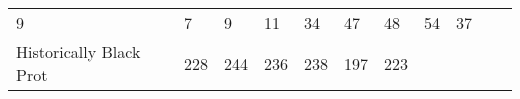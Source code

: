 \documentclass[]{article}
\begin{document}
\begin{longtable}[]{@{}lllllllllll@{}}
\begin{minipage}[t]{0.05\columnwidth}
9\strut
\end{minipage} & \begin{minipage}[t]{0.05\columnwidth}\raggedright\strut
7\strut
\end{minipage} & \begin{minipage}[t]{0.05\columnwidth}\raggedright\strut
9\strut
\end{minipage} & \begin{minipage}[t]{0.05\columnwidth}\raggedright\strut
11\strut
\end{minipage} & \begin{minipage}[t]{0.05\columnwidth}\raggedright\strut
34\strut
\end{minipage} & \begin{minipage}[t]{0.06\columnwidth}\raggedright\strut
47\strut
\end{minipage} & \begin{minipage}[t]{0.06\columnwidth}\raggedright\strut
48\strut
\end{minipage} & \begin{minipage}[t]{0.04\columnwidth}\raggedright\strut
54\strut
\end{minipage} & \begin{minipage}[t]{0.11\columnwidth}\raggedright\strut
37\strut
\end{minipage}\tabularnewline
\begin{minipage}[t]{0.14\columnwidth}\raggedright\strut
Historically Black Prot\strut
\end{minipage} & \begin{minipage}[t]{0.04\columnwidth}\raggedright\strut
228\strut
\end{minipage} & \begin{minipage}[t]{0.05\columnwidth}\raggedright\strut
244\strut
\end{minipage} & \begin{minipage}[t]{0.05\columnwidth}\raggedright\strut
236\strut
\end{minipage} & \begin{minipage}[t]{0.05\columnwidth}\raggedright\strut
238\strut
\end{minipage} & \begin{minipage}[t]{0.05\columnwidth}\raggedright\strut
197\strut
\end{minipage} & \begin{minipage}[t]{0.05\columnwidth}\raggedright\strut
223\strut
\end{minipage} & \begin{minipage}[t]{0.06\columnwidth}\raggedright\strut

\end{minipage}
\end{longtable}
\end{document}
